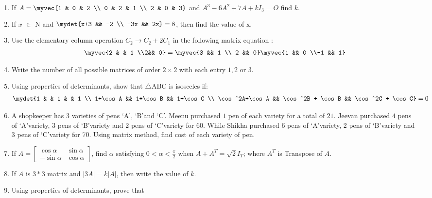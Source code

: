 \begin{enumerate}
    \item If $A = \myvec{1 & 0 & 2 \\ 0 & 2 & 1 \\ 2 & 0 & 3}$ and $A^3 - 6A^2 + 7A + kI_3 = O$ find $k$.
    \item If $x$ $\in $ N and $\mydet{x+3 && -2 \\ -3x && 2x} = 8$, then find the value of x.
    \item Use the elementary column operation $C_2 \rightarrow C_2 + 2C_1$ in the following matrix equation :
          \begin{align*}
              \myvec{2 &  & 1 \\2&& 0} = \myvec{3 && 1 \\ 2 && 0} \myvec{1 && 0 \\-1 && 1}
          \end{align*}
    \item Write the number of all possible matrices of order $2\times2$  with each entry $1,2 \text{ or } 3$.
    \item Using properties of determinants, show that $\triangle$ABC is isosceles if:
          \begin{align*}
              \mydet{1 &  & 1 &  & 1 \\ 1+\cos A && 1+\cos B && 1+\cos C \\ \cos^2A+\cos A && \cos^2B + \cos B && \cos^2C + \cos C}=0
          \end{align*}
    \item A shopkeeper has $3$ varieties of pens \lq A\rq, \lq B\rq and \lq C\rq. Meenu purchased $1$ pen of each variety for a total of \rupee $21$. Jeevan purchased $4$ pens of \lq A\rq variety, $3$ pens of \lq B\rq variety and $2$ pens of \lq C\rq variety for \rupee $60$. While Shikha purchased $6$ pens of \lq A\rq variety, $2$ pens of \lq B\rq variety and $3$ pens of \lq C\rq variety for \rupee $70$. Using matrix method, find cost of each variety of pen.
    \item If \(A = \begin{bmatrix}
              \cos{\alpha}  & \sin{\alpha} \\
              -\sin{\alpha} & \cos{\alpha}
          \end{bmatrix}\), find $\alpha$ satisfying $0<\alpha<\frac{\pi}{2}$ when $A + A^T= \sqrt{2}I_T$; where $A^T$ is Transpose of $A$.
    \item If $A$ is $3*3$ matrix and $|3A| = k|A|$, then write the value of $k$.
    \item Using properties of determinants, prove that\\

\end{enumerate}
